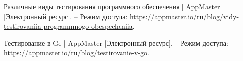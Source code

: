 \begin{references}
	\item\label{ref:testing} Различные виды тестирования программного обеспечения | AppMaster [Электронный ресурс]. --
	Режим доступа: \url{https://appmaster.io/ru/blog/vidy-testirovaniia-programmnogo-obespecheniia}.

	\item\label{ref:go-testing} Тестирование в Go | AppMaster [Электронный ресурс]. --
	Режим доступа: \url{https://appmaster.io/ru/blog/testirovanie-v-go}.





	\label{ref:total}
\end{references}
